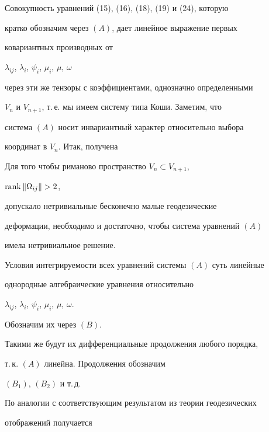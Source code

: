 Совокупность уравнений (15), (16), (18), (19) и (24), которую 


кратко обозначим через $(A)$, дает линейное выражение первых


ковариантных производных от 


$\lambda_{ij}$, $\lambda_i$, $\psi_i$, $\mu_i$, $\mu$, $\omega$ 


через эти же тензоры с коэффициентами, однозначно определенными


$V_n$ и $V_{n+1}$, т.\,е. мы имеем систему типа Коши. Заметим, что


система $(A)$ носит инвариантный характер относительно выбора


координат в $V_n$. Итак, получена 





\begin{thm}


Для того чтобы риманово пространство $V_n\subset V_{n+1}$,


$\rank\|\Omega_{ij}\|>2$, 


допускало нетривиальные бесконечно малые геодезические


деформации, необходимо и достаточно, чтобы система уравнений $(A)$


имела нетривиальное решение.


\end{thm}





Условия интегрируемости всех уравнений системы $(A)$ суть линейные


однородные алгебраические уравнения относительно


$\lambda_{ij}$, $\lambda_i$, $\psi_i$, $\mu_i$, $\mu $, $\omega $. 


Обозначим их через $(B)$.


Такими же будут их дифференциальные продолжения любого порядка,


т.\,к. $(A)$ линейна. Продолжения обозначим


$(B_1)$, $(B_2)$ и т.\,д.








По аналогии с соответствующим результатом из теории геодезических


отображений \cite{si} получается 





